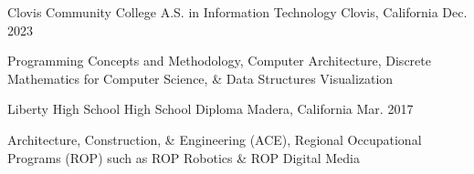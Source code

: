 \begin{cventries}

	\cventry
	{Clovis Community College} %
	{A.S. in Information Technology} %
	{Clovis, California} %
	{Dec. 2023} %
	{
		\begin{cvitems} %
		\item{Programming Concepts and Methodology, Computer Architecture, Discrete Mathematics for Computer Science, \& Data Structures Visualization}
		\end{cvitems}
	}

	\cventry
	  {Liberty High School} %
	  {High School Diploma} %
	  {Madera, California} %
	  {Mar. 2017} %
	  {
	    \begin{cvitems} %
	\item {Architecture, Construction, \& Engineering (ACE), Regional Occupational Programs (ROP) such as ROP Robotics \& ROP Digital Media}
	    \end{cvitems}
	  }
\end{cventries}

